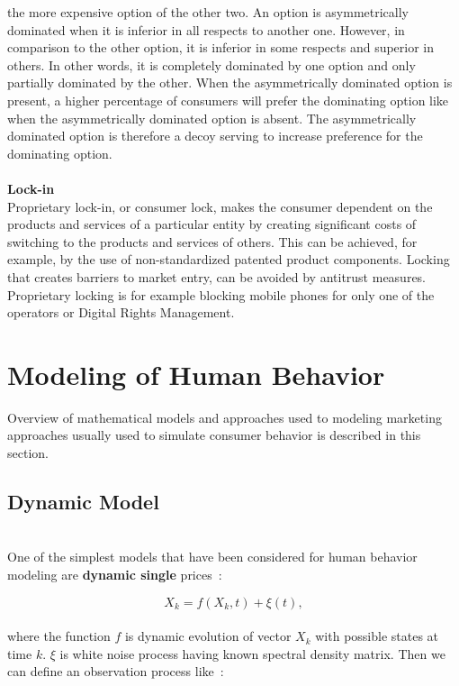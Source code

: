 the more expensive option of the other two.
An option is asymmetrically dominated when it is inferior in all respects to another one.
However, in comparison to the other option, it is inferior in some respects and superior in others.
In other words, it is completely dominated by one option and only partially dominated by the other.
When the asymmetrically dominated option is present, a higher
percentage of consumers will prefer the dominating option like when the asymmetrically dominated option is absent.
The asymmetrically dominated option is therefore a decoy serving to increase preference for the dominating option.\\
\\
\textbf{Lock-in} \label{subsec:lock-in}\\
Proprietary lock-in, or consumer lock, makes the consumer dependent on the products and services of a particular entity
by creating significant costs of switching to the products and services of others.
This can be achieved, for example,
by the use of non-standardized patented product components.
Locking that creates barriers to market entry, can be avoided by antitrust measures.
Proprietary locking is for example blocking mobile phones for only one of the operators or Digital Rights Management.
\\
\section{Modeling of Human Behavior} \label{sec:modeling}
Overview of mathematical models and approaches used to modeling marketing approaches usually used to simulate consumer behavior is described in this section.
\subsection{Dynamic Model} \label{subsec:dynamicModel}\\
One of the simplest models that have been considered for human behavior modeling are \textbf{dynamic single} prices~\cite{pantland}:

\begin{equation} \label{eq:1}
X_k = f(X_k, t) + \xi(t),
\end{equation}
\\
where the function $f$ is dynamic evolution of vector $X_k$ with possible states at time $k$. $\xi$ is white noise process having known spectral density matrix.
Then we can define an observation process like~\cite{pantland}:

